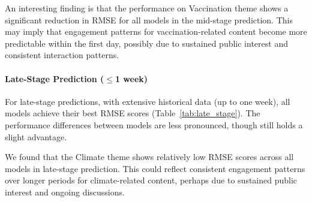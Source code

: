 An interesting finding is that the performance on Vaccination theme shows a significant reduction in RMSE for all models in the mid-stage prediction. This may imply that engagement patterns for vaccination-related content become more predictable within the first day, possibly due to sustained public interest and consistent interaction patterns.


\paragraph{Late-Stage Prediction ($\leq$1 week)}
 For late-stage predictions, with extensive historical data (up to one week), all models achieve their best RMSE scores (Table~\ref{tab:late_stage}). The performance differences between models are less pronounced, though \icmamba still holds a slight advantage.

 We found that the Climate theme shows relatively low RMSE scores across all models in late-stage prediction. This could reflect consistent engagement patterns over longer periods for climate-related content, perhaps due to sustained public interest and ongoing discussions.






